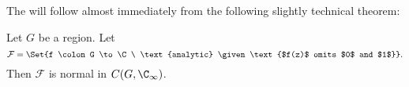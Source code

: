 


The  will follow almost immediately from the following slightly technical theorem:

\clearpage

\begin{theorem}\label{thm9.13}
	Let $G$ be a region.
	Let
	\[
		\mathcal{F} = \Set{f \colon G \to \C\ \text{analytic} \given \text{$f(z)$ omits $0$ and $1$}}.
	\]
	Then $\mathcal{F}$ is normal in $C(G, \C_\infty)$.
\end{theorem}

